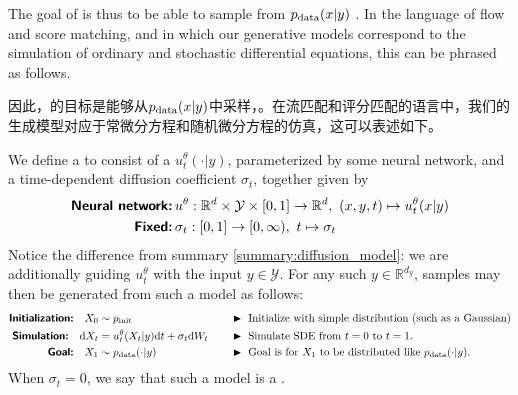 The goal of  is thus to be able to sample from $p_{\rm{data}}(x|y)$ . In the language of flow and score matching, and in which our generative models correspond to the simulation of ordinary and stochastic differential equations, this can be phrased as follows.

因此，的目标是能够从$p_{\rm{data}}(x|y)$中采样，。在流匹配和评分匹配的语言中，我们的生成模型对应于常微分方程和随机微分方程的仿真，这可以表述如下。

\begin{ideabox}
We define a  to consist of a  $u_t^{\theta}(\cdot | y)$, parameterized by some neural network, and a time-dependent diffusion coefficient $\sigma_t$, together given by
\begin{align*}
    \textbf{\sffamily Neural network:}&\, u^\theta: \mathbb{R}^d \times \mathcal{Y} \times [0,1] \to \mathbb{R}^d,\,\, (x,y,t) \mapsto u_t^{\theta}(x|y)\\
    \textbf{\sffamily Fixed:}&\, \sigma_t: [0,1] \to [0,\infty),\,\, t \mapsto \sigma_t
\end{align*}
Notice the difference from summary \ref{summary:diffusion_model}: we are additionally guiding $u_t^\theta$ with the input $y\in \mathcal{Y}$. For any such $y \in \mathbb{R}^{d_y}$, samples may then be generated from such a model as follows:
\begin{align*}
    \textbf{\sffamily Initialization:}\quad X_0&\sim\pinit \quad  &&\blacktriangleright\,\,\text{Initialize with simple distribution (such as a Gaussian)}\\
    \textbf{\sffamily Simulation:}\quad \dd X_t &= u_t^\theta(X_t|y)\dd t + \sigma_t\dd W_t\quad &&\blacktriangleright\,\,\text{Simulate SDE from $t=0$ to $t=1$.}\\
    \textbf{\sffamily Goal:}\quad X_1 &\sim  \pdata(\cdot | y) \quad &&\blacktriangleright\,\,\text{Goal is for $X_1$ to be distributed like $\pdata(\cdot|y)$.}
\end{align*}
When $\sigma_t = 0$, we say that such a model is a .


\end{ideabox}
